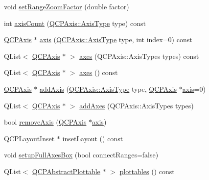 \begin{DoxyCompactItemize}
\item 
void \hyperlink{class_q_c_p_axis_rect_ae83d187b03fc6fa4f00765ad50cd3fc3}{set\+Range\+Zoom\+Factor} (double factor)
\item 
int \hyperlink{class_q_c_p_axis_rect_a16e3e4646e52e4b5d5b865076c29ae58}{axis\+Count} (\hyperlink{class_q_c_p_axis_ae2bcc1728b382f10f064612b368bc18a}{Q\+C\+P\+Axis\+::\+Axis\+Type} type) const 
\item 
\hyperlink{class_q_c_p_axis}{Q\+C\+P\+Axis} $\ast$ \hyperlink{class_q_c_p_axis_rect_a560de44e47a4af0f86c59102a094b1e4}{axis} (\hyperlink{class_q_c_p_axis_ae2bcc1728b382f10f064612b368bc18a}{Q\+C\+P\+Axis\+::\+Axis\+Type} type, int index=0) const 
\item 
Q\+List$<$ \hyperlink{class_q_c_p_axis}{Q\+C\+P\+Axis} $\ast$ $>$ \hyperlink{class_q_c_p_axis_rect_a66654d51ca611ef036ded36250cd2518}{axes} (Q\+C\+P\+Axis\+::\+Axis\+Types types) const 
\item 
Q\+List$<$ \hyperlink{class_q_c_p_axis}{Q\+C\+P\+Axis} $\ast$ $>$ \hyperlink{class_q_c_p_axis_rect_a18dcdc0dd6c7520bc9f3d15a7a3feec2}{axes} () const 
\item 
\hyperlink{class_q_c_p_axis}{Q\+C\+P\+Axis} $\ast$ \hyperlink{class_q_c_p_axis_rect_a2dc336092ccc57d44a46194c8a23e4f4}{add\+Axis} (\hyperlink{class_q_c_p_axis_ae2bcc1728b382f10f064612b368bc18a}{Q\+C\+P\+Axis\+::\+Axis\+Type} type, \hyperlink{class_q_c_p_axis}{Q\+C\+P\+Axis} $\ast$\hyperlink{class_q_c_p_axis_rect_a560de44e47a4af0f86c59102a094b1e4}{axis}=0)
\item 
Q\+List$<$ \hyperlink{class_q_c_p_axis}{Q\+C\+P\+Axis} $\ast$ $>$ \hyperlink{class_q_c_p_axis_rect_a792e1f3d9cb1591fca135bb0de9b81fc}{add\+Axes} (Q\+C\+P\+Axis\+::\+Axis\+Types types)
\item 
bool \hyperlink{class_q_c_p_axis_rect_a03c39cd9704f0d36fb6cf980cdddcbaa}{remove\+Axis} (\hyperlink{class_q_c_p_axis}{Q\+C\+P\+Axis} $\ast$\hyperlink{class_q_c_p_axis_rect_a560de44e47a4af0f86c59102a094b1e4}{axis})
\item 
\hyperlink{class_q_c_p_layout_inset}{Q\+C\+P\+Layout\+Inset} $\ast$ \hyperlink{class_q_c_p_axis_rect_a4114887c7141b59650b7488f930993e5}{inset\+Layout} () const 
\item 
void \hyperlink{class_q_c_p_axis_rect_a5fa906175447b14206954f77fc7f1ef4}{setup\+Full\+Axes\+Box} (bool connect\+Ranges=false)
\item 
Q\+List$<$ \hyperlink{class_q_c_p_abstract_plottable}{Q\+C\+P\+Abstract\+Plottable} $\ast$ $>$ \hyperlink{class_q_c_p_axis_rect_a5b0d629c8de5572945eeae79a142296e}{plottables} () const 

\end{DoxyCompactItemize}
